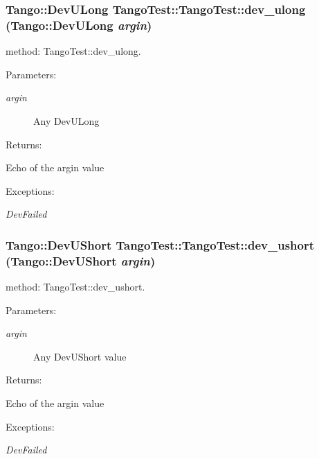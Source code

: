 \subsubsection{\setlength{\rightskip}{0pt plus 5cm}Tango::Dev\-ULong Tango\-Test::Tango\-Test::dev\_\-ulong (Tango::Dev\-ULong {\em argin})}\label{classTangoTest_1_1TangoTest_z5_8}


method: Tango\-Test::dev\_\-ulong.

\begin{Desc}
\item[Parameters: ]\par
\begin{description}
\item[{\em 
argin}]Any Dev\-ULong \end{description}
\end{Desc}
\begin{Desc}
\item[Returns: ]\par
Echo of the argin value \end{Desc}
\begin{Desc}
\item[Exceptions: ]\par
\begin{description}
\item[{\em 
Dev\-Failed}] \end{description}
\end{Desc}
\subsubsection{\setlength{\rightskip}{0pt plus 5cm}Tango::Dev\-UShort Tango\-Test::Tango\-Test::dev\_\-ushort (Tango::Dev\-UShort {\em argin})}\label{classTangoTest_1_1TangoTest_z5_6}


method: Tango\-Test::dev\_\-ushort.

\begin{Desc}
\item[Parameters: ]\par
\begin{description}
\item[{\em 
argin}]Any Dev\-UShort value \end{description}
\end{Desc}
\begin{Desc}
\item[Returns: ]\par
Echo of the argin value \end{Desc}
\begin{Desc}
\item[Exceptions: ]\par
\begin{description}
\item[{\em 
Dev\-Failed}] \end{description}
\end{Desc}
